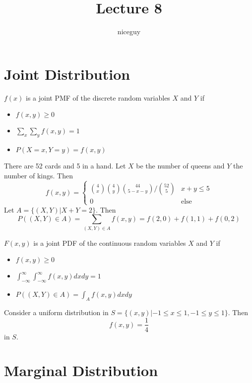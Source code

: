 \documentclass[12pt]{article}
\author{niceguy}
\title{Lecture 8}
\begin{document}
\maketitle

\section{Joint Distribution}

\begin{defn}
	$f(x)$ is a joint PMF of the discrete random variables $X$ and $Y$ if
	\begin{itemize}
		\item $f(x,y)\geq0$
		\item $\sum_x\sum_yf(x,y)=1$
		\item $P(X=x,Y=y) = f(x,y)$
	\end{itemize}
\end{defn}

\begin{ex}
	There are 52 cards and 5 in a hand. Let $X$ be the number of queens and $Y$ the number of kings. Then
	$$f(x,y) = \begin{cases} \binom{4}{x}\binom{4}{y}\binom{44}{5-x-y}/\binom{52}{5} & x+y\leq 5 \\ 0 & \text{else}\end{cases}$$
	Let $A=\{(X,Y)|X+Y=2\}$. Then
	$$P((X,Y)\in A) = \sum_{(X,Y)\in A} f(x,y) = f(2,0) + f(1,1) + f(0,2)$$
\end{ex}

\begin{defn}
	$F(x,y)$ is a joint PDF of the continuous random variables $X$ and $Y$ if
	\begin{itemize}
		\item $f(x,y)\geq 0$
		\item $\int_{-\infty}^\infty\int_{-\infty}^\infty f(x,y)dxdy = 1$
		\item $P((X,Y)\in A) = \int_A f(x,y)dxdy$
	\end{itemize}
\end{defn}

\begin{ex}
	Consider a uniform distribution in $S=\{(x,y)|-1\leq x\leq 1, -1\leq y\leq 1\}$. Then
	$$f(x,y)=\frac{1}{4}$$
	in $S$.
\end{ex}

\section{Marginal Distribution}
\end{document}
